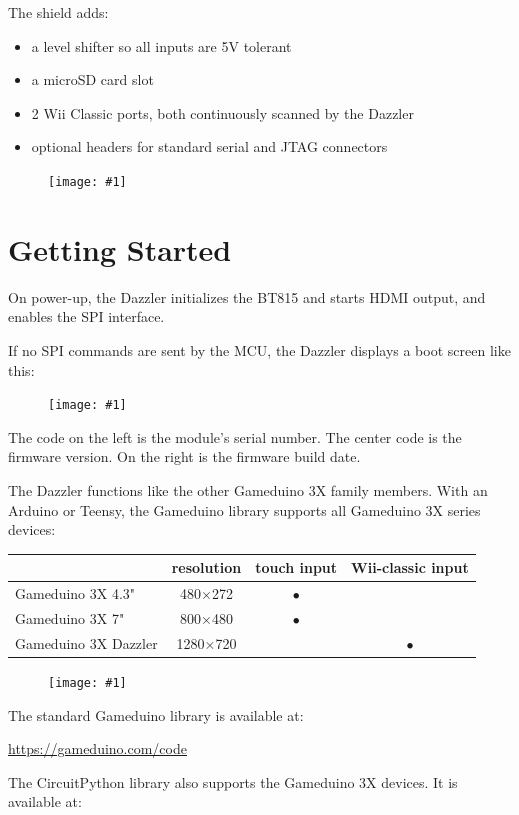 \documentclass{article}
\newcommand{\dev}{Dazzler}
\newcommand{\png}[1]{
\begin{figure}[H]
\begin{center}
\texttt{[image: \#1]}
\end{center}
\end{figure}
}
\newcommand{\pngw}[2]{
\begin{figure}[H]
\begin{center}
\texttt{[image: \#1]}
\end{center}
\end{figure}
}
\newcommand{\gap}{\vspace{10pt}}
\begin{document}
\noindent
The shield adds:
\begin{itemize}
\item a level shifter so all inputs are 5V tolerant
\item a microSD card slot
\item 2 Wii Classic ports, both continuously scanned by the Dazzler
\item optional headers for standard serial and JTAG connectors
\end{itemize}

\png{img/gameduino-3x-dazzler/rot-0182}

\newpage
\section{Getting Started}

On power-up, the \dev{}
initializes the BT815 and starts HDMI output,
and enables the SPI interface.

If no SPI commands are sent by the MCU,
the \dev{}
displays a boot screen like this:

\pngw{img/gameduino-3x-dazzler/boot}{1.0}

The code on the left is the module's serial number. 
The center code is the firmware version. 
On the right is the firmware build date.

The Dazzler functions like the other Gameduino 3X family members.
With an Arduino or Teensy, the Gameduino library supports all Gameduino 3X series devices:

\gap
\begin{tabular}{lccc}

       & resolution & touch input & Wii-classic input \\
\hline

Gameduino 3X 4.3"    & 480$\times$272 & $\bullet$ & \\
Gameduino 3X 7"      & 800$\times$480 & $\bullet$ & \\
Gameduino 3X Dazzler & 1280$\times$720 & & $\bullet$ \\

\end{tabular}
\gap

\pngw{img/gameduino-3x-dazzler/helloworld}{1.0}

The standard Gameduino library is available at:

\url{https://gameduino.com/code}

The CircuitPython library also supports the Gameduino 3X devices.
It is available at:
\end{document}
